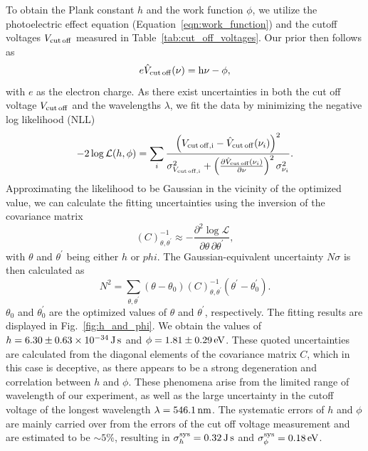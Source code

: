 \documentclass[aps,twocolumn,secnumarabic,balancelastpage,amsmath,amssymb,nofootinbib,floatfix]{revtex4-1}
\newcommand{\ev}{\,{\rm eV}}
\newcommand{\nm}{\,{\rm nm}}
\newcommand{\Js}{\,{\rm J}\,{\rm s}}
\begin{document}
To obtain the Plank constant $h$ and the work function $\phi$, we utilize the photoelectric effect equation (Equation~\ref{eqn:work_function}) and the cutoff voltages $V_{\rm{cut\,off}}$ measured in Table~\ref{tab:cut_off_voltages}. Our prior then follows as
\begin{equation}
    \label{eqn:plank_prior}
    e \hat{V}_{\rm{cut\,off}} (\nu) = {\rm{h}} \nu - \phi,
\end{equation}
with $e$ as the electron charge. As there exist uncertainties in both the cut off voltage $V_{\rm{cut\,off}}$ and the wavelengths $\lambda$, we fit the data by minimizing the negative log likelihood (NLL)
\begin{equation}
    \label{eqn:plank_NLL}
    - 2 \log{\mathcal{L} (h,\phi)} = \sum_i \frac{\left(V_{\rm{cut\,off},i} - \hat{V}_{\rm{cut\,off}} (\nu_i)\right)^2}{\sigma_{V_{\rm{cut\,off},i}}^2 + \left(\frac{\partial \hat{V}_{\rm{cut\,off}} (\nu_i)}{\partial \nu} \right)^2 \sigma_{\nu_i}^2}.
\end{equation}
Approximating the likelihood to be Gaussian in the vicinity of the optimized value, we can calculate the fitting uncertainties using the inversion of the covariance matrix
\begin{equation}
    \label{eqn:plank_cov}
    \left(C\right)^{-1}_{\theta,\theta^{\prime}} \approx - \frac{\partial^2 \log{\mathcal{L}}}{\partial \theta \, \partial \theta^{\prime}},
\end{equation}
with $\theta$ and $\theta^{\prime}$ being either $h$ or $phi$. The Gaussian-equivalent uncertainty $N \sigma$ is then calculated as
\begin{equation}
    \label{eqn:plank_uncertainty}
    N^2 = \sum_{\theta,\theta^{\prime}} \left(\theta - \theta_0\right) \left(C\right)^{-1}_{\theta,\theta^{\prime}} \left(\theta^{\prime} - \theta^{\prime}_0\right).
\end{equation}
$\theta_0$ and $\theta^{\prime}_0$ are the optimized values of $\theta$ and $\theta^{\prime}$, respectively. The fitting results are displayed in Fig.~\ref{fig:h_and_phi}. We obtain the values of $h = 6.30 \pm 0.63 \times 10^{-34}\Js$ and $\phi = 1.81 \pm 0.29\ev$. These quoted uncertainties are calculated from the diagonal elements of the covariance matrix $C$, which in this case is deceptive, as there appears to be a strong degeneration and correlation between $h$ and $\phi$. These phenomena arise from the limited range of wavelength of our experiment, as well as the large uncertainty in the cutoff voltage of the longest wavelength $\lambda = 546.1\nm$. The systematic errors of $h$ and $\phi$ are mainly carried over from the errors of the cut off voltage measurement and are estimated to be $\sim 5\%$, resulting in $\sigma_h^{\rm{sys}} = 0.32\Js$ and $\sigma_\phi^{\rm{sys}} = 0.18\ev$.
\end{document}
